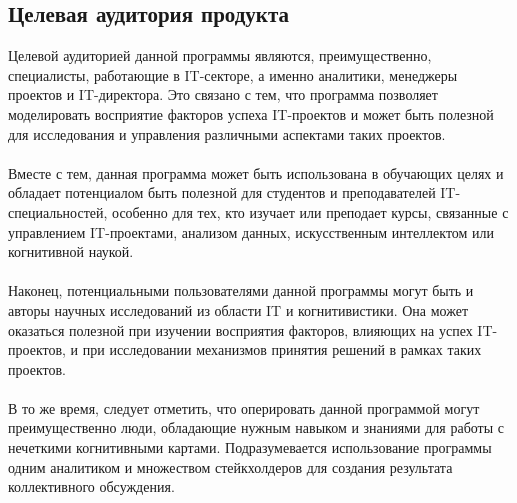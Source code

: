 \documentclass{article}
\begin{document}
    \subsection {Целевая аудитория продукта}
    Целевой аудиторией данной программы являются, преимущественно, специалисты, работающие в IT-секторе, а именно аналитики, менеджеры проектов и IT-директора. Это связано с тем, что программа позволяет моделировать восприятие факторов успеха IT-проектов и может быть полезной для исследования и управления различными аспектами таких проектов.\\
    ~\\
    Вместе с тем, данная программа может быть использована в обучающих целях и обладает потенциалом быть полезной для студентов и преподавателей IT-специальностей, особенно для тех, кто изучает или преподает курсы, связанные с управлением IT-проектами, анализом данных, искусственным интеллектом или когнитивной наукой.\\
    ~\\
    Наконец, потенциальными пользователями данной программы могут быть и авторы научных исследований из области IT и когнитивистики. Она может оказаться полезной при изучении восприятия факторов, влияющих на успех IT-проектов, и при исследовании механизмов принятия решений в рамках таких проектов.\\
    ~\\
    В то же время, следует отметить, что оперировать данной программой могут преимущественно люди, обладающие нужным навыком и знаниями для работы с нечеткими когнитивными картами. Подразумевается использование программы одним аналитиком и множеством стейкхолдеров для создания результата коллективного обсуждения.\\
\end{document}
